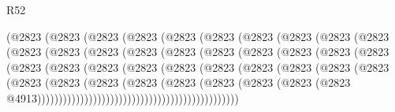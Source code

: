 \begin{lexlean}{R52}
\begin{coremodule}
{{{{{{{{{{{{{{{{{{{{{{{{{{{{{{{{{{{{{{{{{{{{{{{{{{{{{{{{{{{{{{{{{{{{{{{{{{{{{{{{{{{{{{{{{{{{{{{{{{{{{{{{{{{{{{{{{{{{{{{{{{{{{{{{{{{{{{{{{{{{{{{{{{{{{{{{{{{{{{{{{{{{{{{{{{{{{{{{{{{{{{{{{{{{{{{{{{{{{{                    (@2823
                      (@2823
                        (@2823
                          (@2823
                            (@2823
                              (@2823
                                (@2823
                                  (@2823
                                    (@2823
                                      (@2823
                                        (@2823
                                          (@2823
                                            (@2823
                                              (@2823
                                                (@2823
                                                  (@2823
                                                    (@2823
                                                      (@2823
                                                        (@2823
                                                          (@2823
                                                            (@2823
                                                              (@2823
                                                                (@2823
                                                                  (@2823
                                                                    (@2823
                                                                      (@2823
                                                                        (@2823
                                                                          (@2823
                                                                            (@2823
                                                                              (@2823
                                                                                (@2823
                                                                                  (@2823
                                                                                    (@2823
                                                                                      (@2823
                                                                                        (@2823
                                                                                          (@2823
                                                                                            (@2823
                                                                                              (@2823
                                                                                                (@2823
                                                                                                  @4913)))))))))))))))))))))))))))))))))))))))))))))))
}}}}}}}}}}}}}}}}}}}}}}}}}}}}}}}}}}}}}}}}}}}}}}}}}}}}}}}}}}}}}}}}}}}}}}}}}}}}}}}}}}}}}}}}}}}}}}}}}}}}}}}}}}}}}}}}}}}}}}}}}}}}}}}}}}}}}}}}}}}}}}}}}}}}}}}}}}}}}}}}}}}}}}}}}}}}}}}}}}}}}}}}}}}}}}}}}}}}}}
\end{coremodule}
\end{lexlean}
